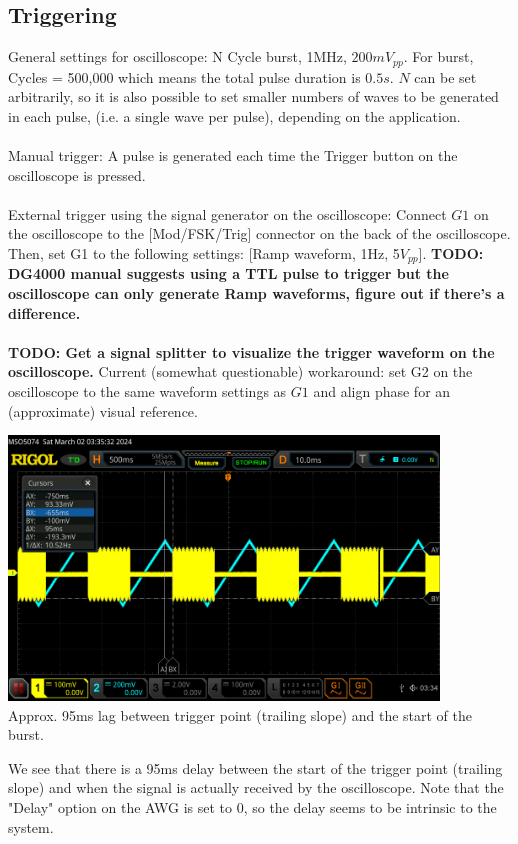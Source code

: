 \documentclass{article}
\begin{document}
    \subsection*{Triggering}
    General settings for oscilloscope: N Cycle burst, 1MHz, $200mV_{pp}.$ For burst, Cycles = 500,000 which means the total pulse duration is $0.5s.$ $N$ can be set arbitrarily, so it is also possible to set smaller numbers of waves to be generated in each pulse, (i.e. a single wave per pulse), depending on the application.\\\\
    Manual trigger: A pulse is generated each time the Trigger button on the oscilloscope is pressed.\\\\
    External trigger using the signal generator on the oscilloscope: Connect $G1$ on the oscilloscope to the [Mod/FSK/Trig] connector on the back of the oscilloscope. Then, set G1 to the following settings: [Ramp waveform, 1Hz, 5$V_{pp}$]. \textbf{TODO: DG4000 manual suggests using a TTL pulse to trigger but the oscilloscope can only generate Ramp waveforms, figure out if there's a difference.}\\\\
    \textbf{TODO: Get a signal splitter to visualize the trigger waveform on the oscilloscope.} Current (somewhat questionable) workaround: set G2 on the oscilloscope to the same waveform settings as $G1$ and align phase for an (approximate) visual reference.
    \begin{mdframed}[backgroundcolor=gray!20, align = center, userdefinedwidth = 4.8in]
    \includegraphics[width = 4.5in]{img/TriggerTest1.png}
    \\Approx. 95ms lag between trigger point (trailing slope) and the start of the burst.
    \end{mdframed}
    We see that there is a 95ms delay between the start of the trigger point (trailing slope) and when the signal is actually received by the oscilloscope. Note that the "Delay" option on the AWG is set to 0, so the delay seems to be intrinsic to the system.\\\\
\end{document}
